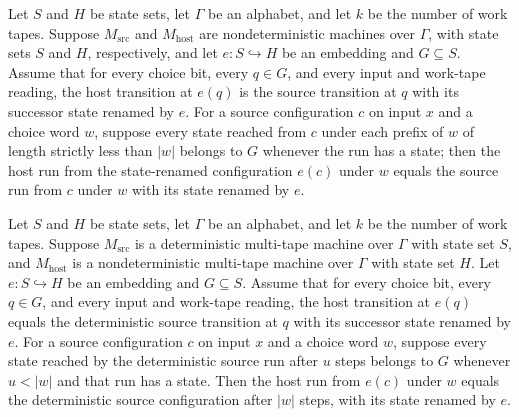 \begin{theorem}
\label{Turing.NDTM.runWith_mapState_of_agreeOn}
\leanok
{}
Let $S$ and $H$ be state sets, let $\Gamma$ be an alphabet, and let $k$ be the number of
work tapes. Suppose $M_{\mathrm{src}}$ and $M_{\mathrm{host}}$ are nondeterministic
machines over $\Gamma$, with state sets $S$ and $H$, respectively, and let
$e:S\hookrightarrow H$ be an embedding and $G\subseteq S$. Assume that for every choice
bit, every $q\in G$, and every input and work-tape reading, the host transition at
$e(q)$ is the source transition at $q$ with its successor state renamed by $e$. For a
source configuration $c$ on input $x$ and a choice word $w$, suppose every state reached
from $c$ under each prefix of $w$ of length strictly less than $|w|$ belongs to $G$
whenever the run has a state; then the host run from the state-renamed configuration
$e(c)$ under $w$ equals the source run from $c$ under $w$ with its state renamed by $e$.
\end{theorem}

\begin{theorem}
\label{Turing.NDTM.runWith_mapState_of_agreeOn_det}
\leanok
{}
Let $S$ and $H$ be state sets, let $\Gamma$ be an alphabet, and let $k$ be the number of
work tapes. Suppose $M_{\mathrm{src}}$ is a deterministic multi-tape machine over
$\Gamma$ with state set $S$, and $M_{\mathrm{host}}$ is a nondeterministic multi-tape
machine over $\Gamma$ with state set $H$. Let $e:S\hookrightarrow H$ be an embedding and
$G\subseteq S$. Assume that for every choice bit, every $q\in G$, and every input and
work-tape reading, the host transition at $e(q)$ equals the deterministic source
transition at $q$ with its successor state renamed by $e$. For a source configuration
$c$ on input $x$ and a choice word $w$, suppose every state reached by the deterministic
source run after $u$ steps belongs to $G$ whenever $u<|w|$ and that run has a state.
Then the host run from $e(c)$ under $w$ equals the deterministic source configuration
after $|w|$ steps, with its state renamed by $e$.
\end{theorem}

